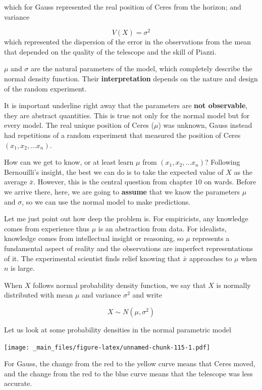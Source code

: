 \documentclass[
]{book}
\begin{document}
which for Gauss represented the real position of Ceres from the horizon; and variance

\[V(X) = \sigma^2\]
which represented the dispersion of the error in the observations from the mean that depended on the quality of the telescope and the skill of Piazzi.

\(\mu\) and \(\sigma\) are the natural parameters of the model, which completely describe the normal density function. Their \textbf{interpretation} depends on the nature and design of the random experiment.

It is important underline right away that the parameters are \textbf{not observable}, they are abstract quantities. This is true not only for the normal model but for every model. The real unique position of Ceres (\(\mu\)) was unknown, Gauss instead had repetitions of a random experiment that measured the position of Ceres \((x_1, x_2, ...x_n)\).

How can we get to know, or at least learn \(\mu\) from \((x_1, x_2, ...x_n)\)? Following Bernouilli's insight, the best we can do is to take the expected value of \(X\) as the average \(\bar{x}\). However, this is the central question from chapter \(10\) on wards. Before we arrive there, here, we are going to \textbf{assume} that we know the parameters \(\mu\) and \(\sigma\), so we can use the normal model to make predictions.

Let me just point out how deep the problem is. For empiricists, any knowledge comes from experience thus \(\mu\) is an abstraction from data. For idealists, knowledge comes from intellectual insight or reasoning, so \(\mu\) represents a fundamental aspect of reality and the observations are imperfect representations of it. The experimental scientist finds relief knowing that \(\bar{x}\) approaches to \(\mu\) when \(n\) is large.

When \(X\) follows normal probability density function, we say that \(X\) is normally distributed with mean \(\mu\) and variance \(\sigma^2\) and write

\[X \sim N(\mu, \sigma^2) \]

Let us look at some probability densities in the normal parametric model

\texttt{[image: \_main\_files/figure-latex/unnamed-chunk-115-1.pdf]}

For Gauss, the change from the red to the yellow curve means that Ceres moved, and the change from the red to the blue curve means that the telescope was less accurate.
\end{document}
